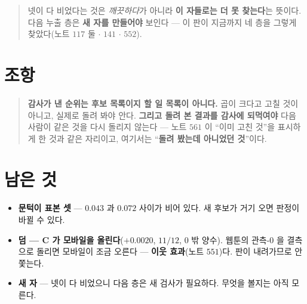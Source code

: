 \documentclass[11pt]{article}
\begin{document}
\begin{quote}
넷이 다 비었다는 것은 \emph{깨끗하다}가 아니라 \textbf{이 자들로는 더
못 찾는다}는 뜻이다. 다음 누출 층은 \textbf{새 자를 만들어야} 보인다 ---
이 판이 지금까지 네 층을 그렇게 찾았다(노트 $117$ 둘 $\cdot$ $141$ $\cdot$
$552$).
\end{quote}

\section*{조항}

\begin{quote}
\textbf{감사가 낸 순위는 후보 목록이지 할 일 목록이 아니다.} 곱이 크다고
고칠 것이 아니고, 실제로 돌려 봐야 안다. \textbf{그리고 돌려 본 결과를
감사에 되먹여야} 다음 사람이 같은 것을 다시 돌리지 않는다 --- 노트 $561$ 이
``이미 고친 것''을 표시하게 한 것과 같은 자리이고, 여기서는
``\textbf{돌려 봤는데 아니었던 것}''이다.
\end{quote}

\section*{남은 것}

\begin{itemize}
\item \textbf{문턱이 표본 셋} --- $0.043$ 과 $0.072$ 사이가 비어 있다.
새 후보가 거기 오면 판정이 바뀔 수 있다.
\item \textbf{덤 --- C 가 모바일을 올린다}($+0.0020$, $11/12$, $0$ 밖
양수). 웹툰의 관측-$0$ 을 결측으로 돌리면 모바일이 조금 오른다 ---
\textbf{이웃 효과}(노트 $551$)다. 판이 내려가므로 안 쫓는다.
\item \textbf{새 자} --- 넷이 다 비었으니 다음 층은 새 검사가 필요하다.
무엇을 볼지는 아직 모른다.
\end{itemize}
\end{document}
